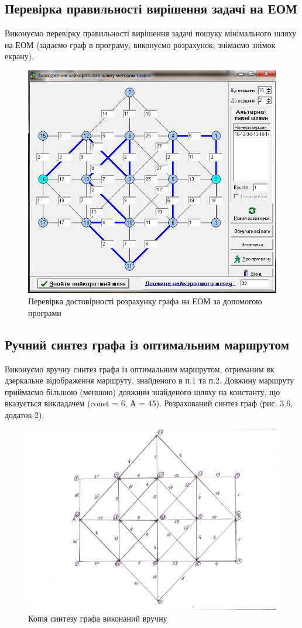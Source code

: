 \subsection{Перевірка правильності вирішення задачі на ЕОМ}
Виконуємо перевірку правильності вирішення задачі пошуку мінімального шляху на ЕОМ (задаємо граф в
програму, виконуємо розрахунок, знімаємо знімок екрану).
\begin{figure}[!ht]
  \centering
  \includegraphics[width=.75\textwidth]{images/lab3/image5.png}
  \caption{Перевірка достовірності розрахунку графа на ЕОМ за допомогою програми}
  \label{f:graph_calculation_check}
\end{figure}

\subsection{Ручний синтез графа із оптимальним маршрутом}
Виконуємо вручну синтез графа із оптимальним маршрутом, отриманим як дзеркальне відображення
маршруту, знайденого в п.1 та п.2. Довжину маршруту приймаємо більшою (меншою) довжини знайденого
шляху на константу, що вказується викладачем (const = 6, А = 45). Розрахований синтез граф
(рис. 3.6, додаток 2).
\begin{figure}[!ht]
  \centering
  \includegraphics[width=.75\textwidth]{images/lab3/image6.png}
  \caption{Копія синтезу графа виконаний вручну}
  \label{f:source_graph_copy_2}
\end{figure}

